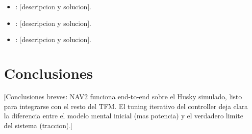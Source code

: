 \documentclass[11pt,a4paper]{article}
\begin{document}
\begin{itemize}
  \item [Problema 1]: [descripcion y solucion].
  \item [Problema 2]: [descripcion y solucion].
  \item [Problema 3]: [descripcion y solucion].
\end{itemize}

\section{Conclusiones}
\label{sec:conclusiones}

[Conclusiones breves: NAV2 funciona end-to-end sobre el Husky simulado, listo
para integrarse con el resto del TFM. El tuning iterativo del controller deja
clara la diferencia entre el modelo mental inicial (mas potencia) y el
verdadero limite del sistema (traccion).]
\end{document}
